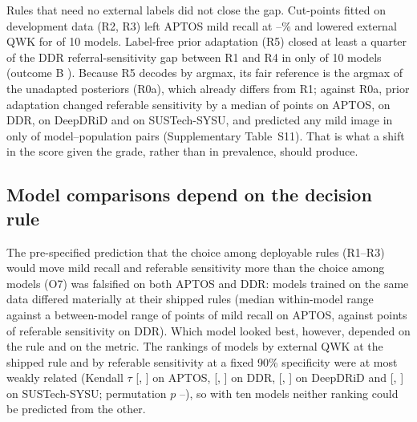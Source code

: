 Rules that need no external labels did not close the gap. Cut-points fitted on development data
(R2, R3) left APTOS mild recall at --\% and lowered
external QWK for  of 10 models. Label-free prior adaptation (R5) closed at
least a quarter of the DDR referral-sensitivity gap between R1 and R4 in only  of
10 models (outcome B ). Because R5 decodes by argmax, its fair reference is the
argmax of the unadapted posteriors (R0a), which already differs from R1; against R0a, prior
adaptation changed referable sensitivity by a median of  points on APTOS,
 on DDR,  on DeepDRiD and
 on SUSTech-SYSU, and predicted any mild image in only
 of  model--population pairs (Supplementary Table~S11). That is
what a shift in the score given the grade, rather than in prevalence, should produce.

\subsection{Model comparisons depend on the decision rule}

The pre-specified prediction that the choice among deployable rules (R1--R3) would move mild
recall and referable sensitivity more than the choice among models (O7) was falsified on both
APTOS and DDR: models trained on the same data differed materially at their shipped rules
(median within-model range  against a between-model range of
 points of mild recall on APTOS,  against
 points of referable sensitivity on DDR). Which model looked best,
however, depended on the rule and on the metric. The rankings of models by external QWK at the
shipped rule and by referable sensitivity at a fixed 90\% specificity were at most weakly related
(Kendall $\tau$  [, ] on APTOS,
 [, ] on DDR, 
[, ] on DeepDRiD and 
[, ] on SUSTech-SYSU; permutation $p$
--), so with ten models neither ranking could be predicted from
the other.

